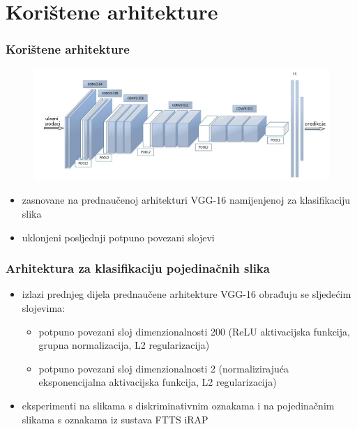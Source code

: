 \documentclass{beamer}
\begin{document}
\section{Korištene arhitekture}
\begin{frame}
\frametitle{Korištene arhitekture}
 \begin{figure}[H]
\centering
\includegraphics[scale=0.5]{images/vgg_architecture.png}
\end{figure} 
\begin{itemize}
 \item zasnovane na prednaučenoj arhitekturi VGG-16 namijenjenoj za klasifikaciju slika 
 \item uklonjeni posljednji potpuno povezani slojevi
\end{itemize}
\end{frame}

\begin{frame}
\frametitle{Arhitektura za klasifikaciju pojedinačnih slika}
 \begin{itemize}
  \item izlazi prednjeg dijela prednaučene arhitekture VGG-16 obrađuju se sljedećim slojevima:
  \begin{itemize}
   \item potpuno povezani sloj dimenzionalnosti 200 (ReLU aktivacijska funkcija, grupna normalizacija, L2 regularizacija)
   \item potpuno povezani sloj dimenzionalnosti 2 (normalizirajuća eksponencijalna aktivacijska funkcija, L2 regularizacija)
  \end{itemize}
  \item eksperimenti na slikama s diskriminativnim oznakama i na pojedinačnim slikama s oznakama iz sustava FTTS iRAP
 \end{itemize}

\end{frame}
\end{document}

